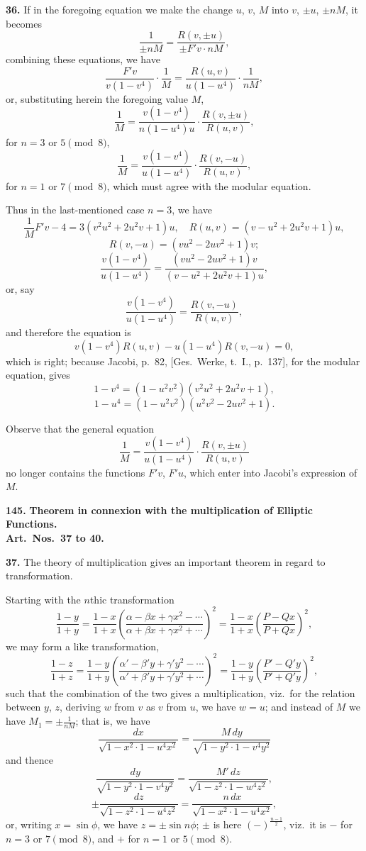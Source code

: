 \documentclass[11pt,a4paper]{article}
\theoremstyle{plain}
\begin{document}
\medskip
\noindent\textbf{36.} If in the foregoing equation we make the change $u$, $v$, $M$ into $v$, $\pm u$, $\pm nM$, it becomes
\[
\frac{1}{\pm nM} = \frac{R(v, \pm u)}{\pm F'v \cdot nM},
\]
combining these equations, we have
\[
\frac{F'v}{v(1 - v^4)} \cdot \frac{1}{M} = \frac{R(u, v)}{u(1 - u^4)} \cdot \frac{1}{nM},
\]
or, substituting herein the foregoing value $M$,
\[
\frac{1}{M} = \frac{v(1 - v^4)}{n(1 - u^4)u} \cdot \frac{R(v, \pm u)}{R(u, v)},
\]
for $n = 3$ or $5 \pmod{8}$,
\[
\frac{1}{M} = \frac{v(1 - v^4)}{u(1 - u^4)} \cdot \frac{R(v, -u)}{R(u, v)},
\]
for $n = 1$ or $7 \pmod{8}$, which must agree with the modular equation.

Thus in the last-mentioned case $n = 3$, we have
\[
\frac{1}{M}F'v - 4 = 3(v^2u^2 + 2u^2v + 1)u, \quad R(u, v) = (v - u^2 + 2u^2v + 1)u,
\]
\[
R(v, -u) = (vu^2 - 2uv^2 + 1)v;
\]
\[
\frac{v(1 - v^4)}{u(1 - u^4)} = \frac{(vu^2 - 2uv^2 + 1)v}{(v - u^2 + 2u^2v + 1)u},
\]
or, say
\[
\frac{v(1 - v^4)}{u(1 - u^4)} = \frac{R(v, -u)}{R(u, v)},
\]
and therefore the equation is
\[
v(1 - v^4)R(u, v) - u(1 - u^4)R(v, -u) = 0,
\]
which is right; because Jacobi, p.~82, [Ges.\ Werke, t.~I., p.~137], for the modular equation, gives
\[
1 - v^4 = (1 - u^2v^2)(v^2u^2 + 2u^2v + 1),
\]
\[
1 - u^4 = (1 - u^2v^2)(u^2v^2 - 2uv^2 + 1).
\]

Observe that the general equation
\[
\frac{1}{M} = \frac{v(1 - v^4)}{u(1 - u^4)} \cdot \frac{R(v, \pm u)}{R(u, v)}
\]
no longer contains the functions $F'v$, $F'u$, which enter into Jacobi's expression of $M$.


\noindent\textbf{145.} \textbf{Theorem in connexion with the multiplication of Elliptic Functions.}\\
\textbf{Art.~Nos.~37 to 40.}

\medskip
\noindent\textbf{37.} The theory of multiplication gives an important theorem in regard to transformation.

Starting with the $n$thic transformation
\[
\frac{1 - y}{1 + y} = \frac{1 - x}{1 + x}\left(\frac{\alpha - \beta x + \gamma x^2 - \cdots}{\alpha + \beta x + \gamma x^2 + \cdots}\right)^2 = \frac{1 - x}{1 + x}\left(\frac{P - Qx}{P + Qx}\right)^2,
\]
we may form a like transformation,
\[
\frac{1 - z}{1 + z} = \frac{1 - y}{1 + y}\left(\frac{\alpha' - \beta'y + \gamma'y^2 - \cdots}{\alpha' + \beta'y + \gamma'y^2 + \cdots}\right)^2 = \frac{1 - y}{1 + y}\left(\frac{P' - Q'y}{P' + Q'y}\right)^2,
\]
such that the combination of the two gives a multiplication, viz.\ for the relation between $y$, $z$, deriving $w$ from $v$ as $v$ from $u$, we have $w = u$; and instead of $M$ we have $M_1 = \pm\frac{1}{nM}$; that is, we have
\[
\frac{dx}{\sqrt{1 - x^2 \cdot 1 - u^4x^2}} = \frac{M\,dy}{\sqrt{1 - y^2 \cdot 1 - v^4y^2}}
\]
and thence
\[
\frac{dy}{\sqrt{1 - y^2 \cdot 1 - v^4y^2}} = \frac{M'\,dz}{\sqrt{1 - z^2 \cdot 1 - w^4z^2}},
\]
\[
\pm\frac{dz}{\sqrt{1 - z^2 \cdot 1 - u^4z^2}} = \frac{n\,dx}{\sqrt{1 - x^2 \cdot 1 - u^4x^2}},
\]
or, writing $x = \sin\phi$, we have $z = \pm\sin n\phi$; $\pm$ is here $(-)^{\frac{n-1}{2}}$, viz.\ it is $-$ for $n = 3$ or $7 \pmod{8}$, and $+$ for $n = 1$ or $5 \pmod{8}$.
\end{document}
